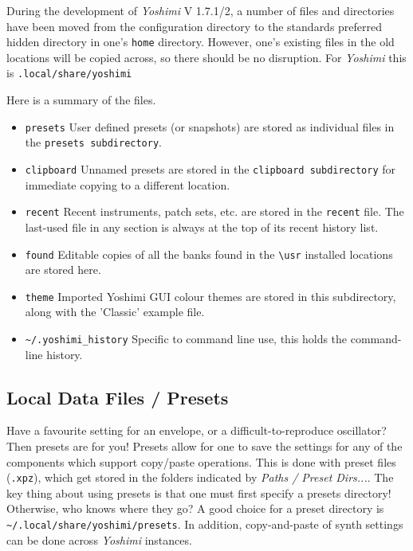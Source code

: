    During the development of \textsl{Yoshimi} V 1.7.1/2, a number of files and
   directories have been moved from the configuration directory to the
   standards preferred hidden directory in one's \texttt{home} directory.
   However, one's existing files in the old locations will be copied across, so
   there should be no disruption. For \textsl{Yoshimi} this is
   \texttt{.local/share/yoshimi}

   Here is a summary of the files.

\begin{itemize}
    \item \texttt{presets}
        User defined presets (or snapshots) are stored as individual files in
        the \texttt{presets subdirectory}.
   \item \texttt{clipboard}
        Unnamed presets are stored in the \texttt{clipboard subdirectory} for
        immediate copying to a different location.
   \item \texttt{recent}
         Recent instruments, patch sets, etc. are stored in the \texttt{recent}
         file. The last-used file in any section is always at the top of its
         recent history list.
    \item \texttt{found}
        Editable copies of all the banks found in the \texttt{\textbackslash usr}
        installed locations are stored here.
    \item \texttt{theme}
        Imported Yoshimi GUI colour themes are stored in this subdirectory, along
        with the 'Classic' example file.
    \item \texttt{\textasciitilde/.yoshimi\_history}
         Specific to command line use, this holds the command-line history.
\end{itemize}

\subsection{Local Data Files / Presets}
\label{subsec:local_data_preset}

   Have a favourite setting for an envelope, or a difficult-to-reproduce
   oscillator? Then presets are for you! Presets allow for one to save the
   settings for any of the components which support copy/paste operations.
   This is done with preset files (\texttt{.xpz}), which get stored in the
   folders indicated by \textsl{Paths / Preset Dirs...}.
   The key thing about using presets is that one must first
   specify a presets directory!  Otherwise, who knows where they go?
   A good choice for a preset directory is
   \texttt{\textasciitilde/.local/share/yoshimi/presets}.
   In addition, copy-and-paste of synth settings can be done across
   \textsl{Yoshimi} instances.

